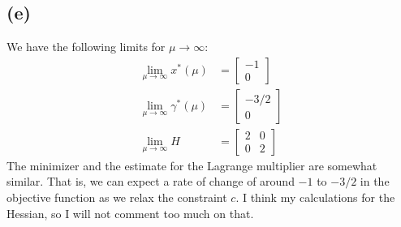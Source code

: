 \documentclass[a4paper, fleqn]{article}
\begin{document}
\subsection*{(e)}
We have the following limits for $\mu\rightarrow \infty$:
\begin{align*}
\lim_{\mu\rightarrow \infty}x^*(\mu)&= \begin{bmatrix} -1 \\ 0 \end{bmatrix} \\
\lim_{\mu\rightarrow \infty}\gamma^*(\mu)&= \begin{bmatrix} -3/2 \\ 0 \end{bmatrix} \\
\lim_{\mu\rightarrow \infty}H&= \begin{bmatrix} 2 & 0 \\ 0 & 2 \end{bmatrix}
\end{align*}
The minimizer and the estimate for the Lagrange multiplier are somewhat similar. That is,
we can expect a rate of change of around $-1$ to $-3/2$ in the objective function as we
relax the constraint $c$. I think my calculations for the Hessian, so I will not comment
too much on that.
\end{document}
